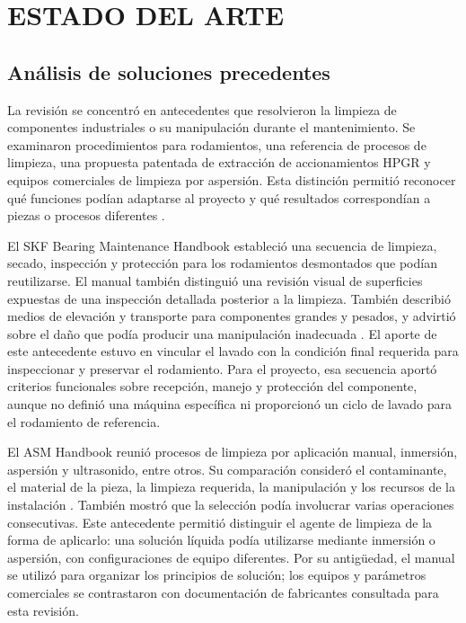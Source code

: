 \chapter{ESTADO DEL ARTE}
\label{cap:estado-arte}

\section{Análisis de soluciones precedentes}

La revisión se concentró en antecedentes que resolvieron la limpieza de componentes industriales o su manipulación durante el mantenimiento. Se examinaron procedimientos para rodamientos, una referencia de procesos de limpieza, una propuesta patentada de extracción de accionamientos HPGR y equipos comerciales de limpieza por aspersión. Esta distinción permitió reconocer qué funciones podían adaptarse al proyecto y qué resultados correspondían a piezas o procesos diferentes \cite{skfmaintenance2011,chalk1994,udy_extraccion_2018,stingray_6075,bvl_pacific}.

El SKF Bearing Maintenance Handbook estableció una secuencia de limpieza, secado, inspección y protección para los rodamientos desmontados que podían reutilizarse. El manual también distinguió una revisión visual de superficies expuestas de una inspección detallada posterior a la limpieza. También describió medios de elevación y transporte para componentes grandes y pesados, y advirtió sobre el daño que podía producir una manipulación inadecuada \cite{skfmaintenance2011}. El aporte de este antecedente estuvo en vincular el lavado con la condición final requerida para inspeccionar y preservar el rodamiento. Para el proyecto, esa secuencia aportó criterios funcionales sobre recepción, manejo y protección del componente, aunque no definió una máquina específica ni proporcionó un ciclo de lavado para el rodamiento de referencia.

El ASM Handbook reunió procesos de limpieza por aplicación manual, inmersión, aspersión y ultrasonido, entre otros. Su comparación consideró el contaminante, el material de la pieza, la limpieza requerida, la manipulación y los recursos de la instalación \cite{chalk1994}. También mostró que la selección podía involucrar varias operaciones consecutivas. Este antecedente permitió distinguir el agente de limpieza de la forma de aplicarlo: una solución líquida podía utilizarse mediante inmersión o aspersión, con configuraciones de equipo diferentes. Por su antigüedad, el manual se utilizó para organizar los principios de solución; los equipos y parámetros comerciales se contrastaron con documentación de fabricantes consultada para esta revisión.

